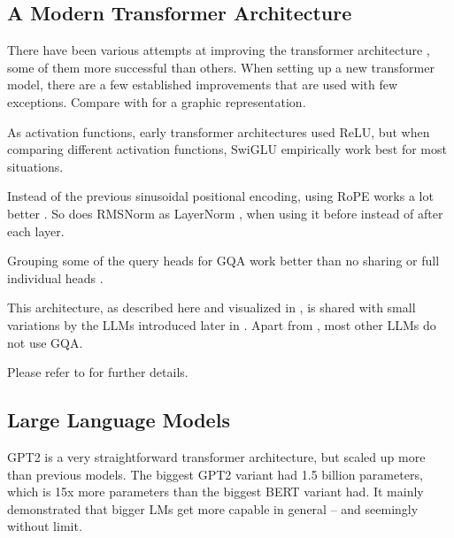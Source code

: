 
\subsection{A Modern Transformer Architecture}\label{sub:modern}

There have been various attempts at improving the transformer architecture \cite{shazeer_glu_2020, su_roformer_2022, ainslie_gqa_2023, bolya_hydra_2022, sukhbaatar_adaptive_2019, lu_understanding_2019, ye_understanding_2023, wu_memorizing_2022}, some of them more successful than others.
When setting up a new transformer model, there are a few established improvements that are used with few exceptions.
Compare with  for a graphic representation.

As activation functions, early transformer architectures used \gls{ReLU}, but when comparing different activation functions, \gls{SwiGLU} \cite{shazeer_glu_2020} empirically work best for most situations.

Instead of the previous sinusoidal positional encoding, using \gls{RoPE} works a lot better \cite{su_roformer_2022}. So does RMSNorm as LayerNorm \cite{ba_layer_2016}, when using it before instead of after each layer.

Grouping some of the query heads for \gls{GQA} \cite{ainslie_gqa_2023} work better than no sharing or full individual heads \cite{bolya_hydra_2022}.



This architecture, as described here and visualized in , is shared with small variations by the \glspl{LLM} introduced later in .
Apart from , most other \glspl{LLM} do not use \gls{GQA}.

Please refer to \cite{naveed_comprehensive_2023} for further details.

\subsection{Large Language Models}\label{sub:llm}

\gls{GPT2} \cite{radford_language_2019} is a very straightforward transformer architecture, but scaled up more than previous models.
The biggest \gls{GPT2} variant had 1.5 billion parameters, which is 15x more parameters than the biggest \gls{BERT} variant had.
It mainly demonstrated that bigger \glspl{LM} get more capable in general -- and seemingly without limit.

